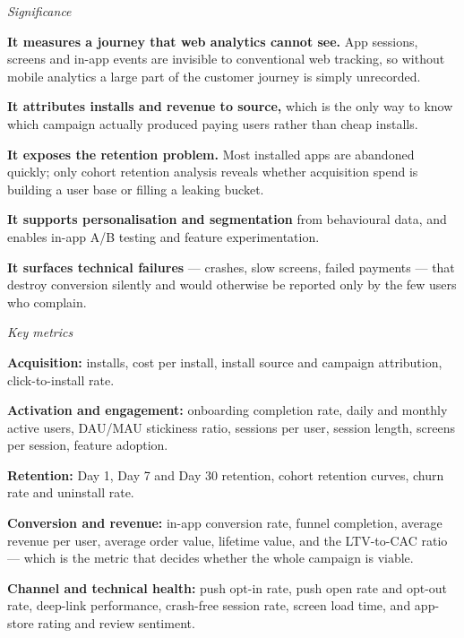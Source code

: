\begin{qlist}
\textit{Significance}
\begin{apts}
\item \textbf{It measures a journey that web analytics cannot see.} App
      sessions, screens and in-app events are invisible to conventional web
      tracking, so without mobile analytics a large part of the customer
      journey is simply unrecorded.
\item \textbf{It attributes installs and revenue to source,} which is the only
      way to know which campaign actually produced paying users rather than
      cheap installs.
\item \textbf{It exposes the retention problem.} Most installed apps are
      abandoned quickly; only cohort retention analysis reveals whether
      acquisition spend is building a user base or filling a leaking bucket.
\item \textbf{It supports personalisation and segmentation} from behavioural
      data, and enables in-app A/B testing and feature experimentation.
\item \textbf{It surfaces technical failures} --- crashes, slow screens, failed
      payments --- that destroy conversion silently and would otherwise be
      reported only by the few users who complain.
\end{apts}

\textit{Key metrics}
\begin{apts}\setcounter{enumi}{5}
\item \textbf{Acquisition:} installs, cost per install, install source and
      campaign attribution, click-to-install rate.
\item \textbf{Activation and engagement:} onboarding completion rate, daily and
      monthly active users, DAU/MAU stickiness ratio, sessions per user, session
      length, screens per session, feature adoption.
\item \textbf{Retention:} Day 1, Day 7 and Day 30 retention, cohort retention
      curves, churn rate and uninstall rate.
\item \textbf{Conversion and revenue:} in-app conversion rate, funnel completion,
      average revenue per user, average order value, lifetime value, and the
      LTV-to-CAC ratio --- which is the metric that decides whether the whole
      campaign is viable.
\item \textbf{Channel and technical health:} push opt-in rate, push open rate
      and opt-out rate, deep-link performance, crash-free session rate, screen
      load time, and app-store rating and review sentiment.
\end{apts}

\end{qlist}
